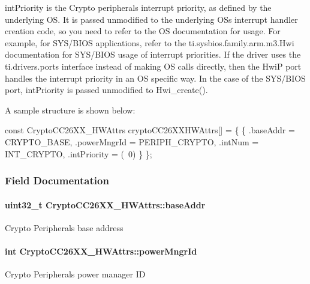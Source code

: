int\+Priority is the Crypto peripheral\textquotesingle{}s interrupt priority, as defined by the underlying O\+S. It is passed unmodified to the underlying O\+S\textquotesingle{}s interrupt handler creation code, so you need to refer to the O\+S documentation for usage. For example, for S\+Y\+S/\+B\+I\+O\+S applications, refer to the ti.\+sysbios.\+family.\+arm.\+m3.\+Hwi documentation for S\+Y\+S/\+B\+I\+O\+S usage of interrupt priorities. If the driver uses the ti.\+drivers.\+ports interface instead of making O\+S calls directly, then the Hwi\+P port handles the interrupt priority in an O\+S specific way. In the case of the S\+Y\+S/\+B\+I\+O\+S port, int\+Priority is passed unmodified to Hwi\+\_\+create().

A sample structure is shown below\+: 
\begin{DoxyCode}
\textcolor{keyword}{const} CryptoCC26XX_HWAttrs cryptoCC26XXHWAttrs[] = \{
    \{
        .baseAddr = CRYPTO\_BASE,
        .powerMngrId = PERIPH\_CRYPTO,
        .intNum = INT\_CRYPTO,
        .intPriority = (~0)
    \}
\};
\end{DoxyCode}
 

\subsubsection{Field Documentation}
\paragraph[{base\+Addr}]{\setlength{\rightskip}{0pt plus 5cm}uint32\+\_\+t Crypto\+C\+C26\+X\+X\+\_\+\+H\+W\+Attrs\+::base\+Addr}\label{struct_crypto_c_c26_x_x___h_w_attrs_a8a6e2dbc65c24f641941ebe3c854e961}
Crypto Peripheral\textquotesingle{}s base address 
\paragraph[{power\+Mngr\+Id}]{\setlength{\rightskip}{0pt plus 5cm}int Crypto\+C\+C26\+X\+X\+\_\+\+H\+W\+Attrs\+::power\+Mngr\+Id}\label{struct_crypto_c_c26_x_x___h_w_attrs_ac5c27633092355d3606d6d0b240b2091}
Crypto Peripheral\textquotesingle{}s power manager I\+D 
